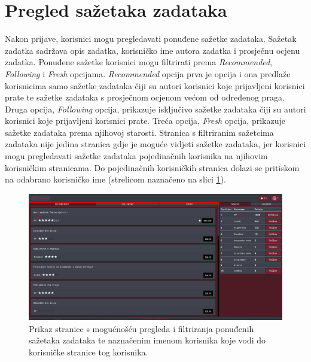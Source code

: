 \documentclass[times, utf8, zavrsni]{fer}
\begin{document}
		\section{Pregled sažetaka zadataka}
		\label{sec:sazetak}
		Nakon prijave, korisnici mogu pregledavati ponuđene sažetke zadataka. Sažetak zadatka sadržava opis zadatka, korisničko ime autora zadatka i prosječnu ocjenu zadatka. Ponuđene sažetke korisnici mogu filtrirati prema \textit{Recommended}, \textit{Following} i  \textit{Fresh} opcijama. \textit{Recommended} opcija prva je opcija i ona predlaže korisnicima samo sažetke zadataka čiji su autori korisnici koje prijavljeni korisnici prate te sažetke zadataka s prosječnom ocjenom većom od određenog praga. Druga opcija, \textit{Following} opcija, prikazuje isključivo sažetke zadataka čiji su autori korisnici koje prijavljeni korisnici prate. Treća opcija, \textit{Fresh} opcija, prikazuje sažetke zadataka prema njihovoj starosti. Stranica s filtriranim sažetcima zadataka nije jedina stranica gdje je moguće vidjeti sažetke zadataka, jer korisnici mogu pregledavati sažetke zadataka pojedinačnih korisnika na njihovim korisničkim stranicama. Do pojedinačnih korisničkih stranica dolazi se pritiskom na odabrano korisničko ime (strelicom naznačeno na slici \ref{fig:pregled}).
		\begin{figure}[htb]
			\centering
			\includegraphics[width=\linewidth]{pictures/koristenje/Pregled.png}
			\caption{Prikaz stranice s mogućnošću pregleda i filtriranja ponuđenih sažetaka zadataka te naznačenim imenom korisnika koje vodi do korisničke stranice tog korisnika.}
			\label{fig:pregled}
		\end{figure}
	
\end{document}

